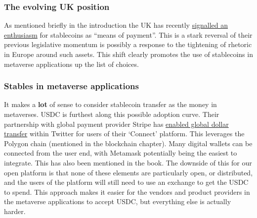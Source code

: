  




\subsubsection{The evolving UK position}
As mentioned briefly in the introduction the UK has recently \href{https://www.gov.uk/government/news/government-sets-out-plan-to-make-uk-a-global-cryptoasset-technology-hub}{signalled an enthusiasm} for stablecoins as ``means of payment''. This is a stark reversal of their previous legislative momentum is possibly a response to the tightening of rhetoric in Europe around such assets. This shift clearly promotes the use of stablecoins in metaverse applications up the list of choices. 
\subsubsection{Stables in metaverse applications}
It makes a \textbf{lot} of sense to consider stablecoin transfer as the money in metaverses. USDC is furthest along this possible adoption curve. Their partnership with global payment provider Stripe has \href{https://stripe.com/blog/expanding-global-payouts-with-crypto}{enabled global dollar transfer} within Twitter for users of their `Connect' platform. This leverages the Polygon chain (mentioned in the blockchain chapter). Many digital wallets can be connected from the user end, with Metamask potentially being the easiest to integrate. This has also been mentioned in the book. The downside of this for our open platform is that none of these elements are particularly open, or distributed, and the users of the platform will still need to use an exchange to get the USDC to spend. This approach makes it easier for the vendors and product providers in the metaverse applications to accept USDC, but everything else is actually harder.

